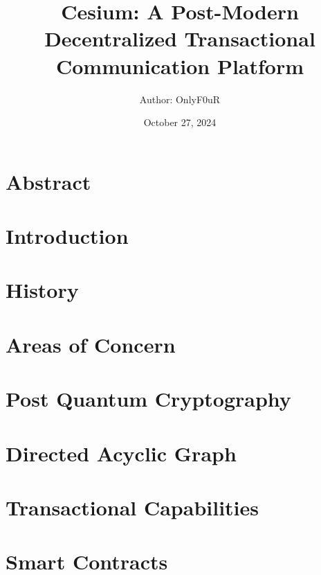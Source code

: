 \documentclass[12px, letterpaper]{article}
\title{Cesium: A Post-Modern Decentralized Transactional Communication Platform}
\author{\normalsize Author: OnlyF0uR\\\normalsize}
\date {\color{black} October 27, 2024}
\begin{document}
\maketitle

\section{Abstract}

\lipsum[1]

\section{Introduction}

\lipsum[1-2]

\section{History}

\lipsum[1-4]

\section{Areas of Concern}
    
\lipsum[1-2]

\section{Post Quantum Cryptography}

\lipsum[1-4] 
    
\section{Directed Acyclic Graph}

\lipsum[1] 

\section{Transactional Capabilities}

\lipsum[1-3]

\section{Smart Contracts}
\end{document}
